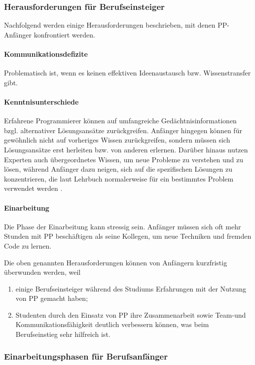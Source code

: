 \subsubsection{Herausforderungen für Berufseinsteiger} \label{sec:PPPotenzial} Nachfolgend werden einige Herausforderungen beschrieben, mit denen PP-Anfänger konfrontiert werden.




\paragraph {Kommunikationsdefizite} Problematisch ist, wenn es keinen effektiven Ideenaustausch bzw. Wissenstransfer gibt.
\paragraph {Kenntnisunterschiede} Erfahrene Programmierer können auf umfangreiche Gedächtnisinformationen bzgl. alternativer Lösungsansätze zurückgreifen. Anfänger hingegen können für gewöhnlich nicht auf vorheriges Wissen zurückgreifen, sondern müssen sich Lösungsansätze erst herleiten bzw. von anderen erlernen. Darüber hinaus nutzen Experten auch übergeordnetes Wissen, um neue Probleme zu verstehen und zu lösen, während Anfänger dazu neigen, sich auf die spezifischen Lösungen zu konzentrieren, die laut Lehrbuch normalerweise für ein bestimmtes  Problem verwendet werden \cite{Bateson1987CognitiveProgrammers}.
\paragraph{ Einarbeitung} Die Phase der Einarbeitung kann stressig sein.  Anfänger müssen sich oft mehr Stunden mit PP beschäftigen als seine Kollegen, um neue Techniken und fremden Code zu lernen.


Die oben genannten Herausforderungen können von Anfängern kurzfristig überwunden werden, weil


\begin{enumerate}[i]
\item einige Berufseinsteiger während des Studiums Erfahrungen mit der Nutzung von PP gemacht haben;
\item Studenten durch den Einsatz von PP ihre Zusammenarbeit sowie Team-und Kommunikationsfähigkeit deutlich verbessern können, was beim Berufseinstieg sehr hilfreich ist.
\end{enumerate}


\subsubsection{Einarbeitungsphasen für Berufsanfänger}


